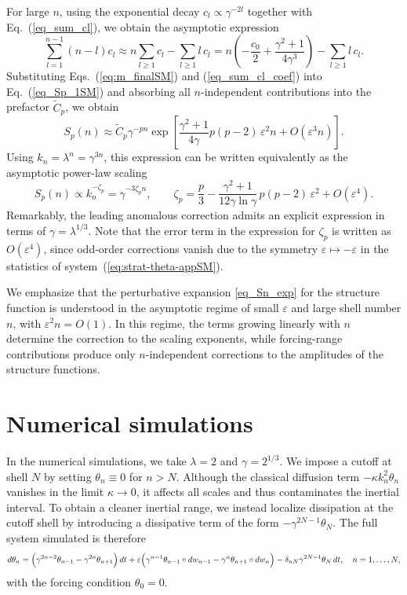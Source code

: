 \documentclass[aps,twocolumn,superscriptaddress]{revtex4-2}
\begin{document}
For large \(n\), using the exponential decay \(c_l \propto \gamma^{-2l}\) together with Eq.~(\ref{eq_sum_cl}), we obtain the asymptotic expression
\begin{equation}
\sum_{l=1}^{n-1}(n-l)c_l
\approx
n\sum_{l \ge 1}c_l
-\sum_{l \ge 1} l\,c_l
=
n\left(-\frac{c_0}{2}+\frac{\gamma^2+1}{4\gamma^3}\right)
-\sum_{l \ge 1} l\,c_l.
\label{eq_sum_cl_coef}
\end{equation}
Substituting Eqs.~(\ref{eq:m_finalSM}) and (\ref{eq_sum_cl_coef}) into Eq.~(\ref{eq_Sp_1SM}) and absorbing all \(n\)-independent contributions into the prefactor \(\tilde{C}_p\), we obtain
\begin{equation}
S_p(n) \approx
\tilde{C}_p\gamma^{-pn}
\exp\left[
\frac{\gamma^2+1}{4\gamma}p(p-2)\,\varepsilon^2 n
+O(\varepsilon^3 n)
\right].
\label{eq_Sn_exp}
\end{equation}
Using \(k_n=\lambda^n=\gamma^{3n}\), this expression can be written equivalently as the asymptotic power-law scaling
\begin{equation}
S_p(n)\propto k_n^{-\zeta_p}
=
\gamma^{-3\zeta_p n},
\qquad
\zeta_p
=
\frac{p}{3}
-\frac{\gamma^2+1}{12\gamma\ln\gamma}\,
p(p-2)\,\varepsilon^2
+O(\varepsilon^4).
\end{equation}
Remarkably, the leading anomalous correction admits an explicit expression in terms of \(\gamma=\lambda^{1/3}\). Note that the error term in the expression for \(\zeta_p\) is written as \(O(\varepsilon^4)\), since odd-order corrections vanish due to the symmetry \(\varepsilon \mapsto -\varepsilon\) in the statistics of system~(\ref{eq:strat-theta-appSM}).

We emphasize that the perturbative expansion \eqref{eq_Sn_exp} for the structure function is understood in the asymptotic regime of small \(\varepsilon\) and large shell number \(n\), with \(\varepsilon^2 n = O(1)\). In this regime, the terms growing linearly with \(n\) determine the correction to the scaling exponents, while forcing-range contributions produce only \(n\)-independent corrections to the amplitudes of the structure functions.

\section{Numerical simulations}

In the numerical simulations, we take $\lambda = 2$ and $\gamma = 2^{1/3}$. We impose a cutoff at shell \(N\) by setting \(\theta_n \equiv 0\) for \(n > N\). Although the classical diffusion term \(-\kappa k_n^2 \theta_n\) vanishes in the limit \(\kappa \to 0\), it affects all scales and thus contaminates the inertial interval. To obtain a cleaner inertial range, we instead localize dissipation at the cutoff shell by introducing a dissipative term of the form \(-\gamma^{2N-1}\theta_N\).
The full system simulated is therefore
\begin{equation}
d\theta_n
=
\Bigl(
\gamma^{2n-2}\theta_{n-1}
-\gamma^{2n}\theta_{n+1}
\Bigr)\,dt
+\varepsilon
\Bigl(
\gamma^{n-1}\theta_{n-1}\circ dw_{n-1}
-\gamma^n \theta_{n+1}\circ dw_n
\Bigr)
-\delta_{nN} \gamma^{2N-1}\theta_N\,dt,
\quad
n = 1,\ldots,N,
\end{equation}
with the forcing condition \(\theta_0 = 0\).
\end{document}
